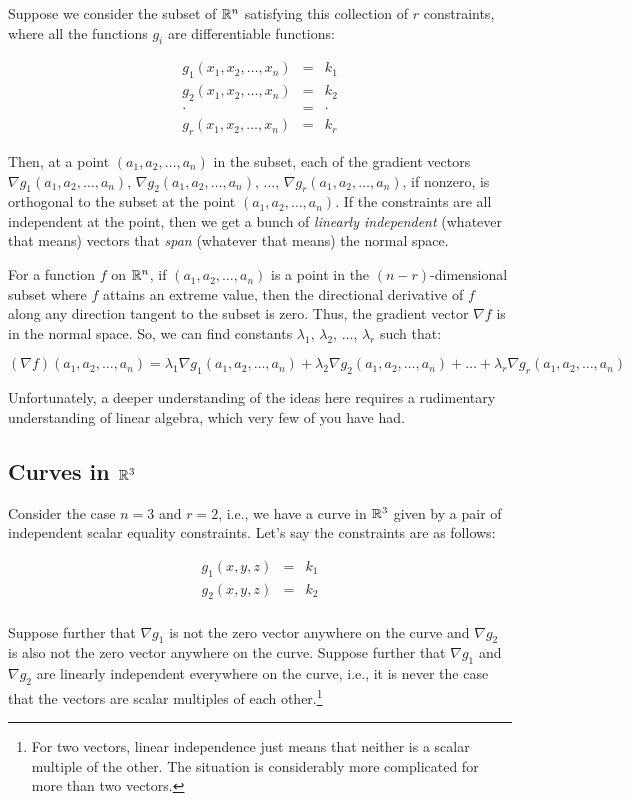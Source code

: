 \documentclass[10pt]{amsart}
\begin{document}
Suppose we consider the subset of $\mathbb{R}^n$ satisfying this collection of
$r$ constraints, where all the functions $g_i$ are differentiable
functions:

\begin{eqnarray*}
  g_1(x_1,x_2,\dots,x_n) & = & k_1\\
  g_2(x_1,x_2,\dots,x_n) & = & k_2\\
  \cdot & = & \cdot \\
  g_r(x_1,x_2,\dots,x_n) & = & k_r
\end{eqnarray*}

Then, at a point $(a_1,a_2,\dots,a_n)$ in the subset, each of the
gradient vectors $\nabla g_1(a_1,a_2,\dots,a_n)$, $\nabla
g_2(a_1,a_2,\dots,a_n)$, $\dots$, $\nabla g_r(a_1,a_2,\dots,a_n)$, if
nonzero, is orthogonal to the subset at the point
$(a_1,a_2,\dots,a_n)$. If the constraints are all independent at the
point, then we get a bunch of {\em linearly independent} (whatever
that means) vectors that {\em span} (whatever that means) the normal
space.

For a function $f$ on $\mathbb{R}^n$, if $(a_1,a_2,\dots,a_n)$ is a point in
the $(n - r)$-dimensional subset where $f$ attains an extreme value,
then the directional derivative of $f$ along any direction tangent to
the subset is zero. Thus, the gradient vector $\nabla f$ is in the
normal space. So, we can find constants $\lambda_1$, $\lambda_2$,
$\dots$, $\lambda_r$ such that:

$$(\nabla f)(a_1,a_2,\dots,a_n) = \lambda_1 \nabla g_1(a_1,a_2,\dots,a_n) + \lambda_2 \nabla g_2(a_1,a_2,\dots,a_n) + \dots + \lambda_r \nabla g_r(a_1,a_2,\dots,a_n)$$

Unfortunately, a deeper understanding of the ideas here requires a
rudimentary understanding of linear algebra, which very few of you
have had.
\subsection{Curves in $\mathbb{R}^3$}

Consider the case $n = 3$ and $r = 2$, i.e., we have a curve in $\mathbb{R}^3$
given by a pair of independent scalar equality constraints. Let's say
the constraints are as follows:

\begin{eqnarray*}
  g_1(x,y,z) & = & k_1 \\
  g_2(x,y,z) & = & k_2 \\
\end{eqnarray*}

Suppose further that $\nabla g_1$ is not the zero vector anywhere on
the curve and $\nabla g_2$ is also not the zero vector anywhere on the
curve. Suppose further that $\nabla g_1$ and $\nabla g_2$ are linearly
independent everywhere on the curve, i.e., it is never the case that
the vectors are scalar multiples of each other.\footnote{For two
vectors, linear independence just means that neither is a scalar
multiple of the other. The situation is considerably more complicated
for more than two vectors.}
\end{document}
